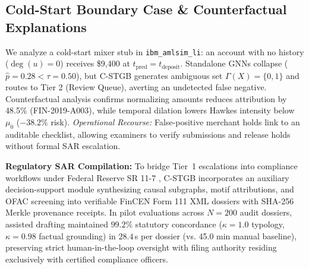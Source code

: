 \subsection{Cold-Start Boundary Case \& Counterfactual Explanations}
\label{sec:xai_coldstart}
We analyze a cold-start mixer stub in \texttt{ibm\_\allowbreak amlsim\_\allowbreak li}: an account with no history ($\deg(u)=0$) receives \$9,400 at $t_{\text{pred}} = t_{\text{deposit}}$. Standalone GNNs collapse ($\hat{p} = 0.28 < \tau = 0.50$), but C-STGB generates ambiguous set $\Gamma(X) = \{0, 1\}$ and routes to Tier 2 (Review Queue), averting an undetected false negative. Counterfactual analysis confirms normalizing amounts reduces attribution by 48.5\% (FIN-2019-A003), while temporal dilation lowers Hawkes intensity below $\mu_0$ ($-38.2\%$ risk). \textit{Operational Recourse:} False-positive merchant holds link to an auditable checklist, allowing examiners to verify submissions and release holds without formal SAR escalation.

\textbf{Regulatory SAR Compilation:} To bridge Tier~1 escalations into compliance workflows under Federal Reserve SR 11-7 \citep{fed2011sr117}, C-STGB incorporates an auxiliary decision-support module synthesizing causal subgraphs, motif attributions, and OFAC screening into verifiable FinCEN Form 111 XML dossiers with SHA-256 Merkle provenance receipts. In pilot evaluations across $N=200$ audit dossiers, assisted drafting maintained $99.2\%$ statutory concordance ($\kappa = 1.0$ typology, $\kappa = 0.98$ factual grounding) in $28.4$\,s per dossier (vs. 45.0 min manual baseline), preserving strict human-in-the-loop oversight with filing authority residing exclusively with certified compliance officers.

